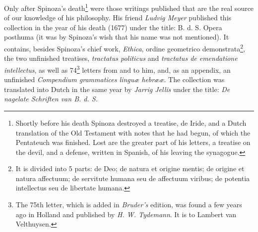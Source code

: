 \documentclass[12pt,a4paper,openany]{book}
\begin{document}
Only after Spinoza's death\footnote{Shortly before his death Spinoza
destroyed a treatise, de Iride, and a Dutch translation of the Old
Testament with notes that he had begun, of which the Pentateuch was
finished. Lost are the greater part of his letters, a treatise on the
devil, and a defense, written in Spanish, of his leaving the synagogue.}
were those writings published that are the real source of our knowledge
of his philosophy. His friend \emph{Ludvig Meyer} published this
collection in the year of his death (1677) under the title: B. d. S.
Opera posthuma (it was by Spinoza's wish that his name was not
mentioned). It contains, besides Spinoza's chief work, \emph{Ethica},
ordine geometrico demonstrata\footnote{It is divided into 5 parts: de
Deo; de natura et origine mentis; de origine et natura affectuum; de
servitute humana seu de affectuum viribus; de potentia intellectus seu de
libertate humana.}, the two unfinished treatises, \emph{tractatus
politicus} and \emph{tractatus de emendatione intellectus}, as well as
74\footnote{The 75th letter, which is added in \emph{Bruder's} edition,
was found a few years ago in Holland and published by \emph{H. W.
Tydemann}. It is to Lambert van Velthuysen.} letters from and to him,
and, as an appendix, an unfinished \emph{Compendium grammatices linguæ
hebrææ}. The collection was translated into Dutch in the same year by
\emph{Jarrig Jellis} under the title: \emph{De nagelate Schriften van B.
d. S.}
\end{document}
